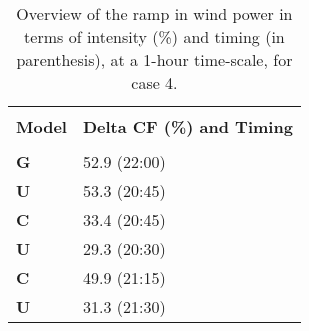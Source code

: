 
\begin{table}[htpb]
    \caption{Overview of the ramp in wind power in terms of intensity (\%) and timing (in parenthesis), at a 1-hour time-scale, for case 4.}
    \centering
    \begin{tabular}{l|p{3cm}}
        \hline \\
        \textbf{Model} & \textbf{Delta CF (\%) and Timing} \\
        \hline \\
            \textbf{G} & 52.9 (22:00) \\
        \textbf{U} & 53.3 (20:45) \\
        \textbf{C} & 33.4 (20:45) \\
        \textbf{U} & 29.3 (20:30) \\
        \textbf{C} & 49.9 (21:15) \\
        \textbf{U} & 31.3 (21:30) \\

        \hline
    \end{tabular}
    \label{ramp_in_capacity_factor_combined_case_4}
\end{table}
